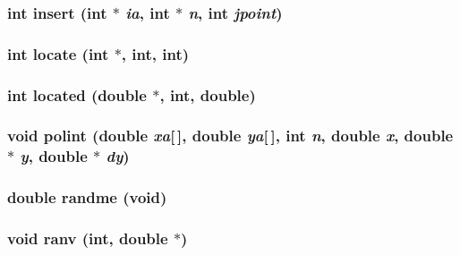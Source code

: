 \subsubsection{\setlength{\rightskip}{0pt plus 5cm}int insert (int $\ast$ {\em ia}, int $\ast$ {\em n}, int {\em jpoint})}\label{utils_8c_0c2855d2933bc1e9b13db385a6cb1b89}


\subsubsection{\setlength{\rightskip}{0pt plus 5cm}int locate (int $\ast$, int, int)}\label{utils_8c_ef48aed7ae14f44ca251a9e5c706143a}


\subsubsection{\setlength{\rightskip}{0pt plus 5cm}int located (double $\ast$, int, double)}\label{utils_8c_a9076cfcf56516f75455bfd637f64dcb}


\subsubsection{\setlength{\rightskip}{0pt plus 5cm}void polint (double {\em xa}[$\,$], double {\em ya}[$\,$], int {\em n}, double {\em x}, double $\ast$ {\em y}, double $\ast$ {\em dy})}\label{utils_8c_9e781dcc9df20e8b93139c48b5627be1}


\subsubsection{\setlength{\rightskip}{0pt plus 5cm}double randme (void)}\label{utils_8c_ad91818df0230e0271f9d12657e86c05}


\subsubsection{\setlength{\rightskip}{0pt plus 5cm}void ranv (int, double $\ast$)}\label{utils_8c_e00f994f73b2547be1a808732cd56d86}


